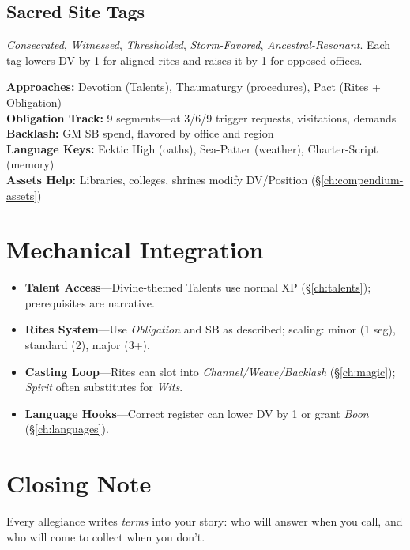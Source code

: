 \begin{multicols}{2}
\subsection*{Sacred Site Tags}
\textit{Consecrated}, \textit{Witnessed}, \textit{Thresholded}, \textit{Storm-Favored}, \textit{Ancestral-Resonant}. Each tag lowers DV by 1 for aligned rites and raises it by 1 for opposed offices.

\begin{tcolorbox}[colback=purple!5!white,colframe=purple!75!black,title=Divine \& Patron Quick Reference,fonttitle=\bfseries]
\textbf{Approaches:} Devotion (Talents), Thaumaturgy (procedures), Pact (Rites + Obligation) \\
\textbf{Obligation Track:} 9 segments—at 3/6/9 trigger requests, visitations, demands \\
\textbf{Backlash:} GM SB spend, flavored by office and region \\
\textbf{Language Keys:} Ecktic High (oaths), Sea-Patter (weather), Charter-Script (memory) \\
\textbf{Assets Help:} Libraries, colleges, shrines modify DV/Position (\S\ref{ch:compendium-assets})
\end{tcolorbox}

\section{Mechanical Integration}
\begin{itemize}
  \item \textbf{Talent Access}—Divine-themed Talents use normal XP (\S\ref{ch:talents}); prerequisites are narrative.
  \item \textbf{Rites System}—Use \emph{Obligation} and SB as described; scaling: minor (1 seg), standard (2), major (3+).
  \item \textbf{Casting Loop}—Rites can slot into \emph{Channel/Weave/Backlash} (\S\ref{ch:magic}); \emph{Spirit} often substitutes for \emph{Wits}.
  \item \textbf{Language Hooks}—Correct register can lower DV by 1 or grant \emph{Boon} (\S\ref{ch:languages}).
\end{itemize}

\section*{Closing Note}
Every allegiance writes \emph{terms} into your story: who will answer when you call, and who will come to collect when you don’t.

\end{multicols}
